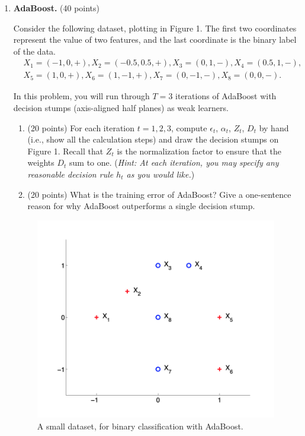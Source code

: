 \documentclass[twoside,10pt]{article}
\begin{document}
\begin{enumerate}
\clearpage
\item  {\bf AdaBoost.} (40 points)

Consider the following dataset, plotting in Figure 1. The first two coordinates represent the value of two features, and the last coordinate is the binary label of the data.
\begin{equation*}
\begin{split}
&X_1 = (-1, 0, +), X_2 = (-0.5, 0.5, +), X_3 = (0, 1, -), X_4 = (0.5, 1, -), \\
&X_5 = (1, 0, +), X_6 = (1, -1, +), X_7 = (0, -1, -), X_8 = (0, 0, -).
\end{split}
\end{equation*}

In this problem, you will run through $T = 3$ iterations of AdaBoost with decision stumps (axis-aligned half planes) as weak learners.

\begin{enumerate}
\item (20 points) For each iteration $t = 1, 2, 3$, compute $\epsilon_t$, $\alpha_t$, $Z_t$, $D_t$ by hand (i.e., show all the calculation steps) and draw the decision stumps on Figure 1. Recall that $Z_t$ is the normalization factor to ensure that the weights $D_t$ sum to one. ({\it Hint: At each iteration, you may specify  any reasonable decision rule $h_t$ as you would like.})

\item (20 points) What is the training error of AdaBoost? Give a one-sentence reason for why AdaBoost outperforms a single decision stump.
\end{enumerate}

\clearpage

\begin{figure}
\begin{center}
\includegraphics[width = 1\textwidth]{hw}
\end{center}
\caption{ A small dataset, for binary classification with AdaBoost.}
\end{figure}
\end{enumerate}
\end{document}

